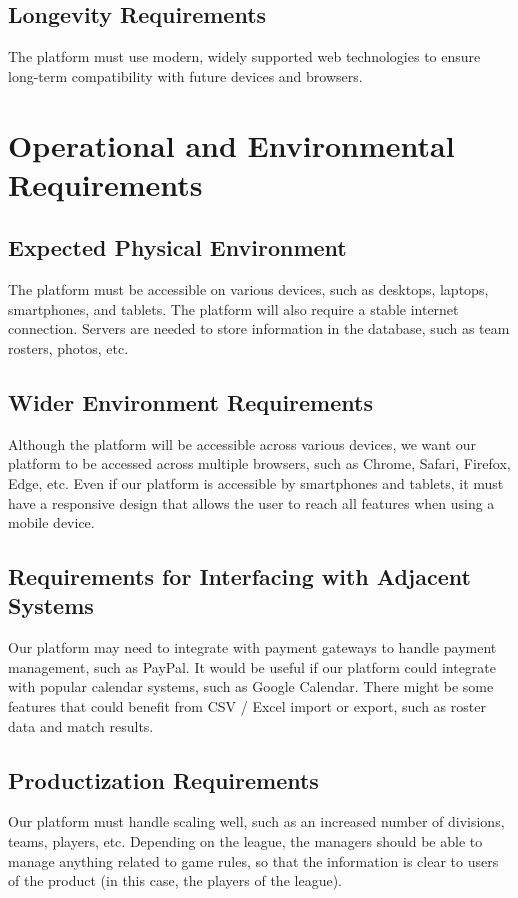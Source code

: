 \documentclass[12pt]{article}
\begin{document}
\subsection{Longevity Requirements}
The platform must use modern, widely supported web technologies to ensure long-term compatibility with future devices and browsers.

\section{Operational and Environmental Requirements}
\subsection{Expected Physical Environment}
The platform must be accessible on various devices, such as desktops, laptops, smartphones, and tablets.
The platform will also require a stable internet connection.
Servers are needed to store information in the database, such as team rosters, photos, etc.

\subsection{Wider Environment Requirements}
Although the platform will be accessible across various devices, we want our platform to be accessed across multiple browsers, such as Chrome, Safari, Firefox, Edge, etc.
Even if our platform is accessible by smartphones and tablets, it must have a responsive design that allows the user to reach all features when using a mobile device.

\subsection{Requirements for Interfacing with Adjacent Systems}
Our platform may need to integrate with payment gateways to handle payment management, such as PayPal.
It would be useful if our platform could integrate with popular calendar systems, such as Google Calendar.
There might be some features that could benefit from CSV / Excel import or export, such as roster data and match results.

\subsection{Productization Requirements}
Our platform must handle scaling well, such as an increased number of divisions, teams, players, etc.
Depending on the league, the managers should be able to manage anything related to game rules, so that the information is clear to users of the product (in this case, the players of the league).
\end{document}
